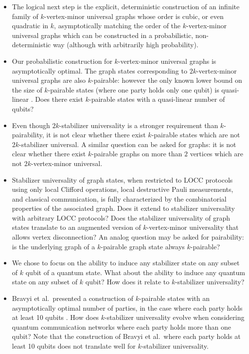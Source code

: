\documentclass[10pt,a4paper]{article}
\begin{document}
 \begin{itemize}
    \item The logical next step is the explicit, deterministic construction of an infinite family of $k$-vertex-minor universal graphs whose order is cubic, or even quadratic in $k$, asymptotically matching the order of the $k$-vertex-minor universal graphs which can be constructed in a probabilistic, non-deterministic way (although with arbitrarily high probability).
     \item Our probabilistic construction for $k$-vertex-minor universal graphs is asymptotically optimal. The graph states corresponding to $2k$-vertex-minor universal graphs are also $k$-pairable: however the only known lower bound on the size of $k$-pairable states (where one party holds only one qubit) is quasi-linear \cite{bravyi2022generating}. Does there exist $k$-pairable states with a quasi-linear number of qubits? 
     \item Even though $2k$-stabilizer universality is a stronger requirement than $k$-pairability, it is not clear whether there exist $k$-pairable states which are not $2k$-stabilizer universal. A similar question can be asked for graphs: it is not clear whether there exist $k$-pairable graphs on more than $2$ vertices which are not $2k$-vertex-minor universal.
     \item Stabilizer universality of graph states, when restricted to LOCC protocols using only local Clifford operations, local destructive Pauli measurements, and classical communication, is fully characterized by the combinatorial properties of the associated graph. Does it extend to stabilizer universality with arbitrary LOCC protocols? Does the stabilizer universality of graph states translate to an augmented version of $k$-vertex-minor universality that allows vertex disconnection? An analog question may be asked for pairability: is the underlying graph of a $k$-pairable graph state always $k$-pairable?
     \item We chose to focus on the ability to induce any stabilizer state on any subset of $k$ qubit of a quantum state. What about the ability to induce any quantum state on any subset of $k$ qubit? How does it relate to $k$-stabilizer universality?
     \item Bravyi et al.~presented a construction of $k$-pairable states with an asymptotically optimal number of parties, in the case where each party holds at least 10 qubits \cite{bravyi2022generating}. How does $k$-stabilizer universality evolve when considering quantum communication networks where each party holds more than one qubit? Note that the construction of Bravyi et al.~where each party holds at least 10 qubits does not translate well for $k$-stabilizer universality.
 \end{itemize}
\end{document}
